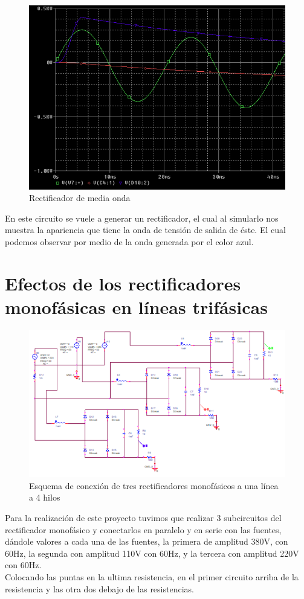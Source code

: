 \documentclass[12pt,a4paper]{article}
\begin{document}
\begin{figure}[hbtp]
\centering
\includegraphics[scale=0.45]{8.png}
\caption{Rectificador de media onda}
\end{figure}
En este circuito se vuele a generar un rectificador, el cual al simularlo nos muestra la apariencia que tiene la onda de tensión de salida de éste. El cual podemos observar por medio de la onda generada por el color azul.

\newpage
\section{Efectos de los rectificadores monofásicas en líneas trifásicas}
\begin{figure}[hbtp]
\centering
\includegraphics[scale=0.7]{9.png}
\caption{Esquema de conexión de tres rectificadores monofásicos a una línea a 4 hilos}
\end{figure}
Para la realización de este proyecto tuvimos que realizar 3 subcircuitos del rectificador monofásico y conectarlos en paralelo y en serie con las fuentes, dándole valores a cada una de las fuentes, la primera de amplitud 380V, con 60Hz, la segunda con amplitud 110V con 60Hz, y la tercera con amplitud 220V con 60Hz.\\
Colocando las puntas en la ultima resistencia, en el primer circuito arriba de la resistencia y las otra dos debajo de las resistencias.
\end{document}

